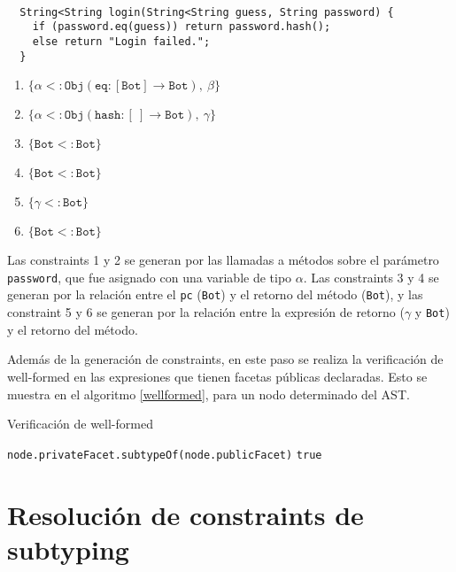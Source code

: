 \begin{ej}\ \\
  \label{ej3-1}
  \normalfont
  \begin{lstlisting}
  String<String login(String<String guess, String password) {
    if (password.eq(guess)) return password.hash();
    else return "Login failed.";
  }
  \end{lstlisting}
  \begin{enumerate}
    \item $\mathtt{\{\alpha <: Obj(eq : [Bot] \rightarrow Bot),\ \beta\}}$
    \item $\mathtt{\{\alpha <: Obj(hash : [\ ] \rightarrow Bot),\ \gamma\}}$
    \item $\mathtt{\{Bot <: Bot\}}$
    \item $\mathtt{\{Bot <: Bot\}}$
    \item $\mathtt{\{\gamma <: Bot\}}$
    \item $\mathtt{\{Bot <: Bot\}}$
  \end{enumerate}
\end{ej}


Las constraints 1 y 2 se generan por las llamadas a métodos sobre el parámetro \texttt{password}, que fue asignado con una variable de tipo $\alpha$. Las constraints 3 y 4 se generan por la relación entre el \texttt{pc} (\texttt{Bot}) y el retorno del método (\texttt{Bot}), y las constraint 5 y 6 se generan por la relación entre la expresión de retorno ($\gamma$ y \texttt{Bot}) y el retorno del método.

Además de la generación de constraints, en este paso se realiza la verificación de well-formed en las expresiones que tienen facetas públicas declaradas. Esto se muestra en el algoritmo \ref{wellformed}, para un nodo determinado del AST.

\begin{algorithm}\captionsetup{labelsep=newline}
  \centering
  \caption{Verificación de well-formed}
  \label{wellformed}
    \begin{algorithmic}[1]
            \State \Return \texttt{node.privateFacet.subtypeOf(node.publicFacet)}
          \EndIf
          \State \Return \texttt{true}
      \EndFunction
    \end{algorithmic}
\end{algorithm}

\section{Resolución de constraints de subtyping} \label{propuestaRes}

